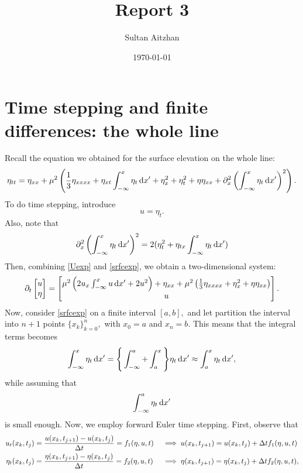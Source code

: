 \documentclass[10pt,reqno,oneside,a4paper]{article}
\author{Sultan Aitzhan}
\title{Report 3}
\date{\today}
\begin{document}
\maketitle
\thispagestyle{fancy}
\tableofcontents


\section{Time stepping and finite differences: the whole line}

Recall the equation we obtained for the surface elevation on the whole line:
\begin{equation}\label{srfcexp}
\eta_{tt} = \eta_{xx} + \mu^2\left( \frac{1}{3} \eta_{xxxx} + \eta_{xt} \int^{x}_{-\infty} \eta_t \,\mathrm{d} x' + \eta^2_x + \eta^2_t +\eta \eta_{xx} + \partial_x^2 \left(\int^{x}_{-\infty} \eta_t \,\mathrm{d} x' \right)^2 \right).
\end{equation}
To do time stepping, introduce
\begin{equation}\label{Uexp}
u = \eta_t.
\end{equation}
Also, note that 
\[ 
\partial_x^2 \left(\int^{x}_{-\infty} \eta_t \,\mathrm{d} x' \right)^2 = 2(\eta_t^2 + \eta_{tx} \int^x_{-\infty}\eta_t \,\mathrm{d} x')
\]
Then, combining \eqref{Uexp} and \eqref{srfcexp}, we obtain a two-dimensional system:
\begin{equation}\label{systemeq1}
  \partial_t \begin{bmatrix} u \\ \eta \end{bmatrix} =
  \begin{bmatrix} 
  \mu^2\left(2 u_{x} \int^{x}_{-\infty} u \,\mathrm{d} x' +2 u^2 \right) + \eta_{xx} + \mu^2 \left( \frac{1}{3} \eta_{xxxx} + \eta^2_x + \eta\eta_{xx} \right) \\
  u \end{bmatrix}.
\end{equation}
Now, consider \eqref{srfcexp} on a finite interval $[a,b],$ and let partition the interval into $n+1$ points $\{ x_k\}^n_{k=0},$ with $x_0 = a$ and $x_n = b.$ This means that the integral terms becomes
\[ 
\int^{x}_{-\infty} \eta_t \,\mathrm{d} x' = \Bigg\{\int^{a}_{-\infty} + \int^x_a \Bigg\} \eta_t \,\mathrm{d} x' \approx \int^x_a \eta_t \,\mathrm{d} x', 
\]
while assuming that 
\[ \int^{a}_{-\infty}  \eta_t \,\mathrm{d} x' \]
is small enough. Now, we employ forward Euler time stepping. First, observe that
\begin{align*}
u_t(x_k, t_j) &= \frac{u(x_k, t_{j+1}) - u(x_k, t_j)}{\Delta t} = f_1(\eta, u, t) &&\implies u(x_k, t_{j+1}) = u(x_k, t_j) + \Delta t f_1(\eta, u, t) \\
\eta_t(x_k, t_j) &= \frac{\eta(x_k, t_{j+1}) - \eta(x_k, t_j)}{\Delta t} = f_2(\eta, u, t) &&\implies \eta(x_k, t_{j+1}) =  \eta(x_k, t_j)+ \Delta t f_2(\eta, u, t), 
\end{align*}
\end{document}

